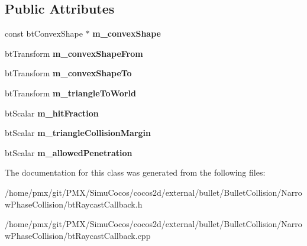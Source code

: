 \subsection*{Public Attributes}
\begin{DoxyCompactItemize}
\item 
\mbox{\label{classbtTriangleConvexcastCallback_a442a37e5dace64ad078f38740e19cb06}} 
const bt\+Convex\+Shape $\ast$ {\bfseries m\+\_\+convex\+Shape}
\item 
\mbox{\label{classbtTriangleConvexcastCallback_aab60a7be21e4fd6c8139bb2570637804}} 
bt\+Transform {\bfseries m\+\_\+convex\+Shape\+From}
\item 
\mbox{\label{classbtTriangleConvexcastCallback_a5dcc11b83390358d62115e26595b369d}} 
bt\+Transform {\bfseries m\+\_\+convex\+Shape\+To}
\item 
\mbox{\label{classbtTriangleConvexcastCallback_a52e81f79e5164a46df5ae43bece29eb5}} 
bt\+Transform {\bfseries m\+\_\+triangle\+To\+World}
\item 
\mbox{\label{classbtTriangleConvexcastCallback_a51408b7878294c6255bcbf522df49971}} 
bt\+Scalar {\bfseries m\+\_\+hit\+Fraction}
\item 
\mbox{\label{classbtTriangleConvexcastCallback_ac10d5afa47d0ccd2fa5446569962b39f}} 
bt\+Scalar {\bfseries m\+\_\+triangle\+Collision\+Margin}
\item 
\mbox{\label{classbtTriangleConvexcastCallback_ae093478803bf03fa70e45bec053c765e}} 
bt\+Scalar {\bfseries m\+\_\+allowed\+Penetration}
\end{DoxyCompactItemize}


The documentation for this class was generated from the following files\+:\begin{DoxyCompactItemize}
\item 
/home/pmx/git/\+P\+M\+X/\+Simu\+Cocos/cocos2d/external/bullet/\+Bullet\+Collision/\+Narrow\+Phase\+Collision/bt\+Raycast\+Callback.\+h\item 
/home/pmx/git/\+P\+M\+X/\+Simu\+Cocos/cocos2d/external/bullet/\+Bullet\+Collision/\+Narrow\+Phase\+Collision/bt\+Raycast\+Callback.\+cpp\end{DoxyCompactItemize}
